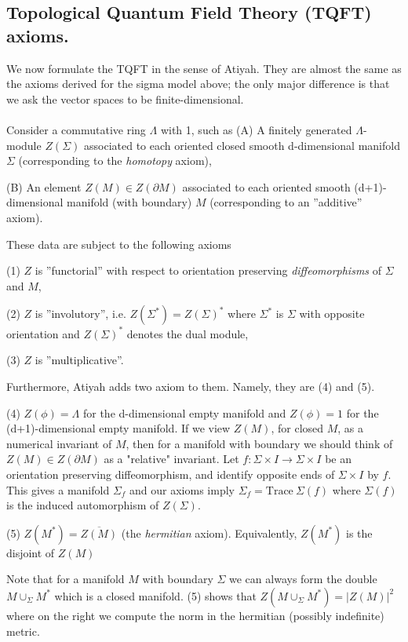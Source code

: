  \subsection{Topological Quantum Field Theory (TQFT) axioms.}
 We now formulate the TQFT in the sense of Atiyah. They are almost the same as the axioms derived for the sigma model
 above; the only major difference is that we ask the vector spaces to be finite-dimensional. 
\paragraph{} Consider a commutative ring $\Lambda$ with 1, such as \Cbb 
(A) A finitely generated $\Lambda$-module $Z(\Sigma)$ associated to each oriented closed smooth d-dimensional manifold $\Sigma$ (corresponding to the \textit{homotopy} axiom),

(B) An element $Z(M)\in Z(\partial M)$ associated to each oriented smooth (d+1)-dimensional manifold (with boundary) $M$ (corresponding to an ''additive'' axiom). 

These data are subject to the following axioms

(1) $Z$ is ''functorial'' with respect to orientation preserving \textit{diffeomorphisms} of $\Sigma$ and $M$,

(2) $Z$ is ''involutory'', i.e. $Z(\Sigma^*)=Z(\Sigma)^*$ where $\Sigma^*$ is $\Sigma$ with opposite orientation and $Z(\Sigma)^*$ denotes the dual module,

(3) $Z$ is ''multiplicative''.

Furthermore, Atiyah adds two axiom to them. Namely, they are (4) and (5).

(4) $Z(\phi)=\Lambda$ for the d-dimensional empty manifold and $Z(\phi)=1$ for the (d+1)-dimensional empty manifold.
If we view   $Z(M)  $, for closed   $M  $, as a numerical invariant of   $M  $, 
then for a manifold with boundary we should think of   $Z(M)\in Z(\partial M)  $
as a "relative" invariant. Let   $f:\Sigma\times I\rightarrow\Sigma\times I  $ 
be an orientation preserving diffeomorphism, and identify opposite ends of   $\Sigma\times I  $ by   $f  $. 
This gives a manifold   $\Sigma_f  $ and our axioms imply
  $\Sigma_f=\text{Trace}\ \Sigma(f)  $
where   $\Sigma(f)  $ is the induced automorphism of   $Z(\Sigma)  $.


(5)   $Z(M^*)=\overline{Z(M)}  $ (the \textit{hermitian} axiom). Equivalently,   $Z(M^*)  $ is the disjoint of   $Z(M)  $

Note that for a manifold   $M  $ with boundary   $\Sigma  $ we can always form the double   $M\cup_\Sigma M^*  $ which is a closed manifold. (5) shows that
  $Z(M\cup_\Sigma M^*)=|Z(M)|^2  $
where on the right we compute the norm in the hermitian (possibly indefinite) metric.
